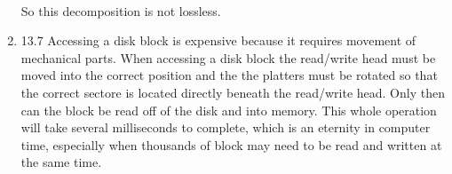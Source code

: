\documentclass[11pt,fleqn]{article}
\begin{document}
\begin{enumerate}
\begin{tabular}{|r|r|r|r|r|r|r|r|r|r|r|}
\end{tabular}
\\
So this decomposition is not lossless. 
\item 
13.7 %
Accessing a disk block is expensive because it requires movement of mechanical parts. When accessing a disk block the read/write head must be moved into the correct position and the the platters must be rotated so that the correct sectore is located directly beneath the read/write head. Only then can the block be read off of the disk and into memory. This whole operation will take several milliseconds to complete, which is an eternity in computer time, especially when thousands of block may need to be read and written at the same time. 
\end{enumerate}
\end{document}
